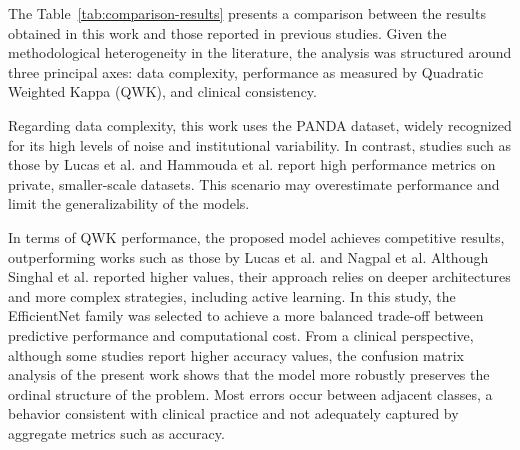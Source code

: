 The Table~\ref{tab:comparison-results} presents a comparison between the results obtained in this work and those reported in previous studies. Given the methodological heterogeneity in the literature, the analysis was structured around three principal axes: data complexity, performance as measured by Quadratic Weighted Kappa (QWK), and clinical consistency.

Regarding data complexity, this work uses the PANDA dataset, widely recognized for its high levels of noise and institutional variability. In contrast, studies such as those by Lucas et al. and Hammouda et al. report high performance metrics on private, smaller-scale datasets. This scenario may overestimate performance and limit the generalizability of the models.

In terms of QWK performance, the proposed model achieves competitive results, outperforming works such as those by Lucas et al. and Nagpal et al. Although Singhal et al. reported higher values, their approach relies on deeper architectures and more complex strategies, including active learning. In this study, the EfficientNet family was selected to achieve a more balanced trade-off between predictive performance and computational cost.
From a clinical perspective, although some studies report higher accuracy values, the confusion matrix analysis of the present work shows that the model more robustly preserves the ordinal structure of the problem. Most errors occur between adjacent classes, a behavior consistent with clinical practice and not adequately captured by aggregate metrics such as accuracy.


